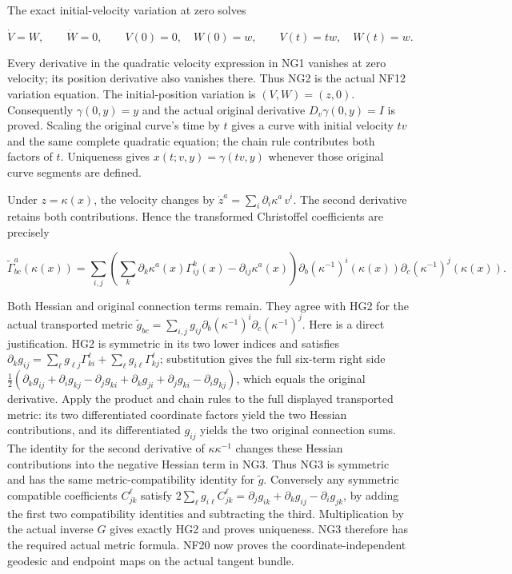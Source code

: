 \documentclass[
  11pt,
]{article}
\begin{document}
The exact initial-velocity variation at zero solves

\[
 \dot V=W,\qquad \dot W=0,\qquad
 V(0)=0,\quad W(0)=w,\qquad
 V(t)=tw,\quad W(t)=w .
 \tag{NG2}
\]

Every derivative in the quadratic velocity expression in NG1 vanishes at
zero velocity; its position derivative also vanishes there. Thus NG2 is
the actual NF12 variation equation. The initial-position variation is
\((V,W)=(z,0)\). Consequently \(\gamma(0,y)=y\) and the actual original
derivative \(D_v\gamma(0,y)=I\) is proved. Scaling the original curve's
time by \(t\) gives a curve with initial velocity \(tv\) and the same
complete quadratic equation; the chain rule contributes both factors of
\(t\). Uniqueness gives \(x(t;v,y)=\gamma(tv,y)\) whenever those
original curve segments are defined.

Under \(z=\kappa(x)\), the velocity changes by
\(\dot z^a=\sum_i\partial_i\kappa^a\,v^i\). The second derivative
retains both contributions. Hence the transformed Christoffel
coefficients are precisely

\[
 \widetilde\Gamma^a_{bc}(\kappa(x))
 =\sum_{i,j}
  \left(\sum_k\partial_k\kappa^a(x)\Gamma^k_{ij}(x)
                  -\partial_{ij}\kappa^a(x)\right)
   \partial_b(\kappa^{-1})^i(\kappa(x))
   \partial_c(\kappa^{-1})^j(\kappa(x)).
 \tag{NG3}
\]

Both Hessian and original connection terms remain. They agree with HG2
for the actual transported metric
\(\widetilde g_{bc}=\sum_{i,j}g_{ij}\partial_b(\kappa^{-1})^i\partial_c(\kappa^{-1})^j\).
Here is a direct justification. HG2 is symmetric in its two lower
indices and satisfies
\(\partial_k g_{ij}=\sum_\ell g_{\ell j}\Gamma^\ell_{ki}+\sum_\ell g_{i\ell}\Gamma^\ell_{kj}\);
substitution gives the full six-term right side
\(\frac12(\partial_kg_{ij}+\partial_ig_{kj}-\partial_jg_{ki}
+\partial_kg_{ji}+\partial_jg_{ki}-\partial_ig_{kj})\), which equals the
original derivative. Apply the product and chain rules to the full
displayed transported metric: its two differentiated coordinate factors
yield the two Hessian contributions, and its differentiated \(g_{ij}\)
yields the two original connection sums. The identity for the second
derivative of \(\kappa\kappa^{-1}\) changes these Hessian contributions
into the negative Hessian term in NG3. Thus NG3 is symmetric and has the
same metric-compatibility identity for \(\widetilde g\). Conversely any
symmetric compatible coefficients \(C^\ell_{jk}\) satisfy
\(2\sum_\ell g_{i\ell}C^\ell_{jk}
=\partial_jg_{ik}+\partial_kg_{ij}-\partial_ig_{jk}\), by adding the
first two compatibility identities and subtracting the third.
Multiplication by the actual inverse \(G\) gives exactly HG2 and proves
uniqueness. NG3 therefore has the required actual metric formula. NF20
now proves the coordinate-independent geodesic and endpoint maps on the
actual tangent bundle.
\end{document}
